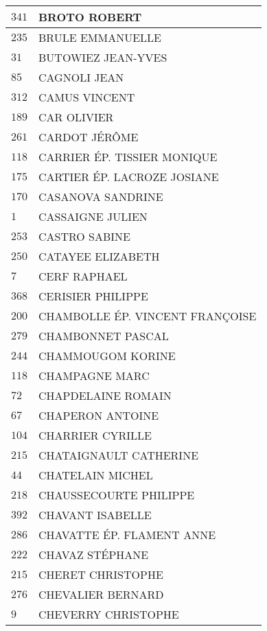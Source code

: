 \begin{xltabular}{\linewidth}{|l|X|}
    \hline
    $341$ & BROTO ROBERT \\
    \hline
    $235$ & BRULE EMMANUELLE \\
    \hline
    $31$ & BUTOWIEZ JEAN-YVES \\
    \hline
    $85$ & CAGNOLI JEAN \\
    \hline
    $312$ & CAMUS VINCENT \\
    \hline
    $189$ & CAR OLIVIER \\
    \hline
    $261$ & CARDOT JÉRÔME \\
    \hline
    $118$ & CARRIER ÉP. TISSIER MONIQUE \\
    \hline
    $175$ & CARTIER ÉP. LACROZE JOSIANE \\
    \hline
    $170$ & CASANOVA SANDRINE \\
    \hline
    $1$ & CASSAIGNE JULIEN \\
    \hline
    $253$ & CASTRO SABINE \\
    \hline
    $250$ & CATAYEE ELIZABETH \\
    \hline
    $7$ & CERF RAPHAEL \\
    \hline
    $368$ & CERISIER PHILIPPE \\
    \hline
    $200$ & CHAMBOLLE ÉP. VINCENT FRANÇOISE \\
    \hline
    $279$ & CHAMBONNET PASCAL \\
    \hline
    $244$ & CHAMMOUGOM KORINE \\
    \hline
    $118$ & CHAMPAGNE MARC \\
    \hline
    $72$ & CHAPDELAINE ROMAIN \\
    \hline
    $67$ & CHAPERON ANTOINE \\
    \hline
    $104$ & CHARRIER CYRILLE \\
    \hline
    $215$ & CHATAIGNAULT CATHERINE \\
    \hline
    $44$ & CHATELAIN MICHEL \\
    \hline
    $218$ & CHAUSSECOURTE PHILIPPE \\
    \hline
    $392$ & CHAVANT ISABELLE \\
    \hline
    $286$ & CHAVATTE ÉP. FLAMENT ANNE \\
    \hline
    $222$ & CHAVAZ STÉPHANE \\
    \hline
    $215$ & CHERET CHRISTOPHE \\
    \hline
    $276$ & CHEVALIER BERNARD \\
    \hline
    $9$ & CHEVERRY CHRISTOPHE \\

\end{xltabular}
